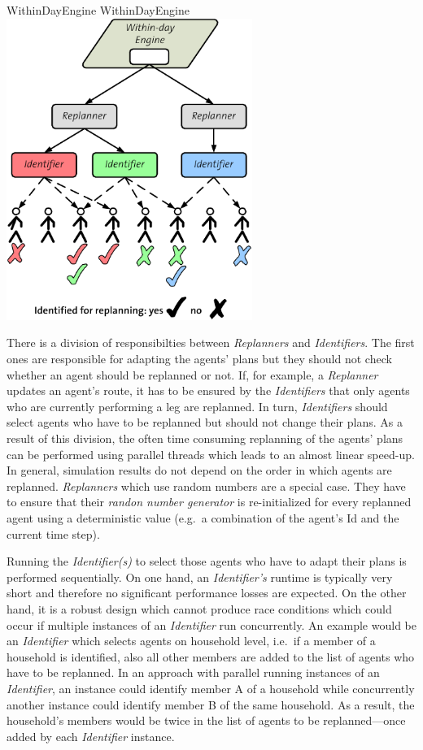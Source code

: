 \createfigure%
{WithinDayEngine}%
{WithinDayEngine}%
{\label{fig:labelWithinDayEngine}}%
{\includegraphics[width=8.0cm, angle=0]{extending/figures/WithinDayReplanning/ReplanningManager}}%
{}

There is a division of responsibilties between \emph{Replanners} and \emph{Identifiers}. The first ones are responsible for adapting the agents' plans but they should not check whether an agent should be replanned or not. If, for example, a \emph{Replanner} updates an agent's route, it has to be ensured by the \emph{Identifiers} that only agents who are currently performing a leg are replanned. In turn, \emph{Identifiers} should select agents who have to be replanned but should not change their plans. As a result of this division, the often time consuming replanning of the agents' plans can be performed using parallel threads which leads to an almost linear speed-up. In general, simulation results do not depend on the order in which agents are replanned. \emph{Replanners} which use random numbers are a special case. They have to ensure that their \emph{randon number generator} is re-initialized for every replanned agent using a deterministic value (e.g.~a combination of the agent's Id and the current time step).

Running the \emph{Identifier(s)} to select those agents who have to adapt their plans is performed sequentially. On one hand, an \emph{Identifier's} runtime is typically very short and therefore no significant performance losses are expected. On the other hand, it is a robust design which cannot produce race conditions which could occur if multiple instances of an \emph{Identifier} run concurrently. An example would be an \emph{Identifier} which selects agents on household level, i.e.~if a member of a household is identified, also all other members are added to the list of agents who have to be replanned. In an approach with parallel running instances of an \emph{Identifier}, an instance could identify member A of  a household while concurrently another instance could identify member B of the same household. As a result, the household's members would be twice in the list of agents to be replanned---once added by each \emph{Identifier} instance.

